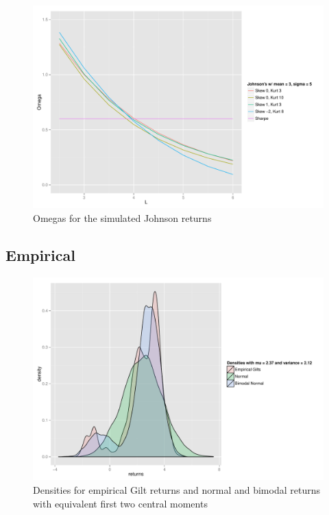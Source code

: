 \documentclass[paper=a4, fontsize=11pt]{scrartcl}
\begin{document}
\begin{figure}[H]
\begin{center}
\includegraphics[width=4.5in]{plots/PreferencesZoom.pdf}
\caption{Omegas for the simulated Johnson returns}
\label{fig:OmegasZoom}
\end{center}
\end{figure}


\subsection{Empirical}

\begin{figure}[H]
\begin{center}
\includegraphics[width=6in]{plots/EmpiricalDensities.pdf}
\caption{Densities for empirical Gilt returns and normal and bimodal returns with equivalent first two central moments}
\label{fig:EmpiricalDensities}
\end{center}
\end{figure}
\end{document}
